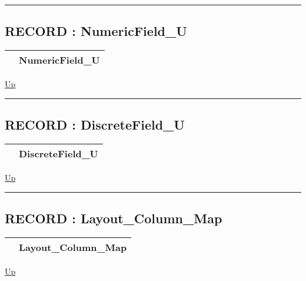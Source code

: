\rule{\textwidth}{0.4pt}
\subsection*{RECORD : NumericField\_U}
\hypertarget{ecldoc:logisticregression.types.numericfield_u}{}

{\renewcommand{\arraystretch}{1.5}
\begin{tabularx}{\textwidth}{|>{\raggedright\arraybackslash}l|X|}
\hline
\hspace{0pt} & NumericField\_U \\
\hline
\end{tabularx}
}

\hyperlink{ecldoc:LogisticRegression.Types}{Up}

\par


\rule{\textwidth}{0.4pt}
\subsection*{RECORD : DiscreteField\_U}
\hypertarget{ecldoc:logisticregression.types.discretefield_u}{}

{\renewcommand{\arraystretch}{1.5}
\begin{tabularx}{\textwidth}{|>{\raggedright\arraybackslash}l|X|}
\hline
\hspace{0pt} & DiscreteField\_U \\
\hline
\end{tabularx}
}

\hyperlink{ecldoc:LogisticRegression.Types}{Up}

\par


\rule{\textwidth}{0.4pt}
\subsection*{RECORD : Layout\_Column\_Map}
\hypertarget{ecldoc:logisticregression.types.layout_column_map}{}

{\renewcommand{\arraystretch}{1.5}
\begin{tabularx}{\textwidth}{|>{\raggedright\arraybackslash}l|X|}
\hline
\hspace{0pt} & Layout\_Column\_Map \\
\hline
\end{tabularx}
}

\hyperlink{ecldoc:LogisticRegression.Types}{Up}

\par


